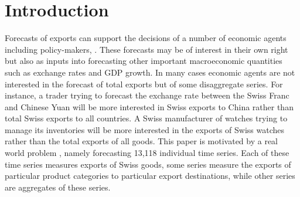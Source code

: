 \documentclass[a4paper,fleqn,11pt]{article}
\begin{document}
			




\section{Introduction}
\label{sec:intro}
Forecasts of exports can support the decisions of a number of economic agents including policy-makers, .  These forecasts may be of interest in their own right but also as inputs into forecasting other important macroeconomic quantities such as exchange rates and GDP growth.  In many cases economic agents are not interested in the forecast of total exports but of some disaggregate series.  For instance, a trader trying to forecast the exchange rate between the Swiss Franc and Chinese Yuan will be more interested in Swiss exports to China rather than total Swiss exports to all countries.  A Swiss manufacturer of watches trying to manage its inventories will be more interested in the exports of Swiss watches rather than the total exports of all goods.  This paper is motivated by a real world problem , namely forecasting 13,118 individual time series. Each of these time series measures exports of Swiss goods, some series measure the exports of particular product categories to particular export destinations, while other series are aggregates of these series.
\end{document}
